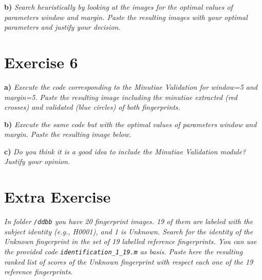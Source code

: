 \documentclass[11pt]{article}
\begin{document}
\textbf{b) }\emph{Search heuristically by looking at the images for the optimal values of parameters window and margin. Paste the resulting images with your optimal parameters and justify your decision.}

\section{Exercise 6}

\textbf{a) }\emph{Execute the code corresponding to the Minutiae Validation for window=5 and margin=5.  Paste the resulting image including the minutiae extracted (red crosses) and validated (blue circles) of both fingerprints. }

\textbf{b) }\emph{Execute the same code but with the optimal values of parameters window and margin. Paste the resulting image below.}

\textbf{c) }\emph{Do you think it is a good idea to include the Minutiae Validation module? Justify your opinion.}

\section{Extra Exercise}

\emph{In folder \texttt{/ddbb} you have 20 fingerprint images. 19 of them are labeled with the subject identity (e.g., H0001), and 1 is Unknown. Search for the identity of the Unknown fingerprint in the set of 19 labelled reference fingerprints. You can use the provided code \texttt{identification\_1\_19.m} as basis. Paste here the resulting ranked list of scores of the Unknown fingerprint with respect each one of the 19 reference fingerprints.}
\end{document}
